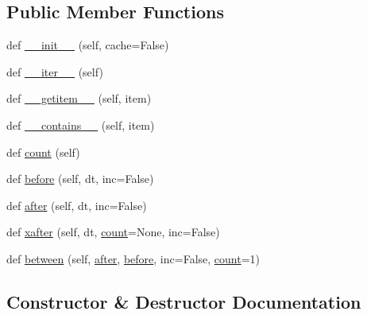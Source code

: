 \subsection*{Public Member Functions}
\begin{DoxyCompactItemize}
\item 
def \hyperlink{classdateutil_1_1rrule_1_1rrulebase_ad9e17f77febe4d4fa1f7b90b3472e06f}{\+\_\+\+\_\+init\+\_\+\+\_\+} (self, cache=False)
\item 
def \hyperlink{classdateutil_1_1rrule_1_1rrulebase_a16b2de7cfd759b04d2b85087f42ff571}{\+\_\+\+\_\+iter\+\_\+\+\_\+} (self)
\item 
def \hyperlink{classdateutil_1_1rrule_1_1rrulebase_a36a69c1f6b6e73d2de3674a1a38e5056}{\+\_\+\+\_\+getitem\+\_\+\+\_\+} (self, item)
\item 
def \hyperlink{classdateutil_1_1rrule_1_1rrulebase_a00ab6e470b9b289c0b73282e11586558}{\+\_\+\+\_\+contains\+\_\+\+\_\+} (self, item)
\item 
def \hyperlink{classdateutil_1_1rrule_1_1rrulebase_ac37491765633ca2bdd968b0d0c763be7}{count} (self)
\item 
def \hyperlink{classdateutil_1_1rrule_1_1rrulebase_ada414103c518022cb528226e3d883d31}{before} (self, dt, inc=False)
\item 
def \hyperlink{classdateutil_1_1rrule_1_1rrulebase_a22a3d56cdfa2d43fc6e248201aa2e930}{after} (self, dt, inc=False)
\item 
def \hyperlink{classdateutil_1_1rrule_1_1rrulebase_ae755a3d4f64406c6b07c848f9b88e2ef}{xafter} (self, dt, \hyperlink{classdateutil_1_1rrule_1_1rrulebase_ac37491765633ca2bdd968b0d0c763be7}{count}=None, inc=False)
\item 
def \hyperlink{classdateutil_1_1rrule_1_1rrulebase_aeda40011e55697486047552e4bd7237e}{between} (self, \hyperlink{classdateutil_1_1rrule_1_1rrulebase_a22a3d56cdfa2d43fc6e248201aa2e930}{after}, \hyperlink{classdateutil_1_1rrule_1_1rrulebase_ada414103c518022cb528226e3d883d31}{before}, inc=False, \hyperlink{classdateutil_1_1rrule_1_1rrulebase_ac37491765633ca2bdd968b0d0c763be7}{count}=1)
\end{DoxyCompactItemize}


\subsection{Constructor \& Destructor Documentation}
\mbox{\label{classdateutil_1_1rrule_1_1rrulebase_ad9e17f77febe4d4fa1f7b90b3472e06f}} 
